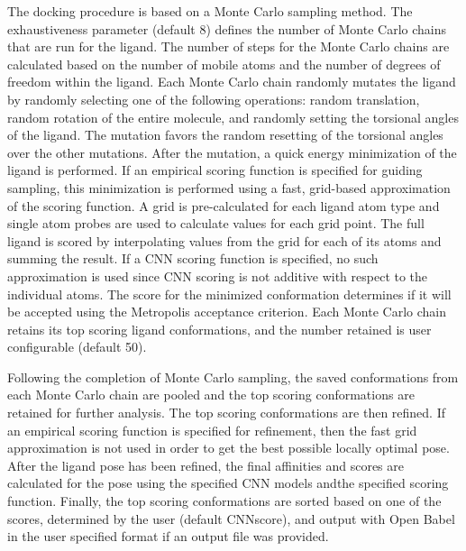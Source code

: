 \documentclass[journal=jcisd8,manuscript=article]{achemso}
\begin{document}
The docking procedure is based on a Monte Carlo sampling method. The exhaustiveness parameter (default $8$) defines the number of Monte Carlo chains that are run for the ligand. The number of steps for the Monte Carlo chains are calculated based on the number of mobile atoms and the number of degrees of freedom within the ligand. Each Monte Carlo chain randomly mutates the ligand by randomly selecting one of the following operations: random translation, random rotation of the entire molecule, and randomly setting the torsional angles of the ligand. The mutation favors the random resetting of the torsional angles over the other mutations. After the mutation, a quick energy minimization of the ligand is performed.  If an empirical scoring function is specified for guiding sampling, this minimization is performed using a fast, grid-based approximation of the scoring function.  A grid is pre-calculated for each ligand atom type and single atom probes are used to calculate values for each grid point.  The full ligand is scored by interpolating values from the grid for each of its atoms and summing the result.  If a CNN scoring function is specified, no such approximation is used since CNN scoring is not additive with respect to the individual atoms\cite{hochuli2018visualizing}.
 The score for the minimized conformation determines if it will be accepted using the Metropolis acceptance criterion. Each Monte Carlo chain retains its top scoring  ligand conformations, and the number retained is user configurable (default 50).

Following the completion of Monte Carlo sampling, the saved conformations from each Monte Carlo chain are pooled and the top scoring conformations are retained for further analysis. The top scoring conformations are then refined.  If an empirical scoring function is specified for refinement, then the fast grid approximation is not used in order to get the best possible locally optimal pose. After the ligand pose has been refined, the final affinities and scores are calculated for the pose using the specified CNN models and\or the specified scoring function. Finally, the top scoring conformations are sorted based on one of the scores, determined by the user (default CNNscore), and output with Open Babel in the user specified format if an output file was provided.
\end{document}
